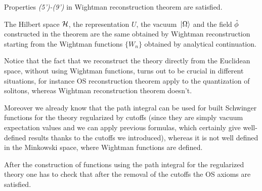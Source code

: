 \documentclass[../main/main.tex]{subfiles}
\begin{document}
\begin{theorem}
	Properties \textit{(5')-(9')} in Wightman reconstruction theorem are satisfied.
	
	The Hilbert space $\mathcal H$, the representation $U$, the vacuum $\,\vert\Omega\rangle$ and the field $\hat{\phi}$ constructed in the theorem are the same obtained by Wightman reconstruction starting from the Wightman functions $\{W_n\}$ obtained by analytical continuation. 
\end{theorem}

Notice that the fact that we reconstruct the theory directly from the Euclidean space, without using Wightman functions, turns out to be crucial in different situations, for instance OS reconstruction theorem apply to the quantization of solitons, whereas Wightman reconstruction theorem doesn't. 

Moreover we already know that the path integral can be used for built Schwinger functions for the theory regularized by cutoffs (since they are simply vacuum expectation values and we can apply previous formulas, which certainly give well-defined results thanks to the cutoffs we introduced), whereas it is not well defined in the Minkowski space, where Wightman functions are defined. 

After the construction of functions using the path integral for the regularized theory one has to check that after the removal of the cutoffs the OS axioms are satisfied. 
\end{document}
